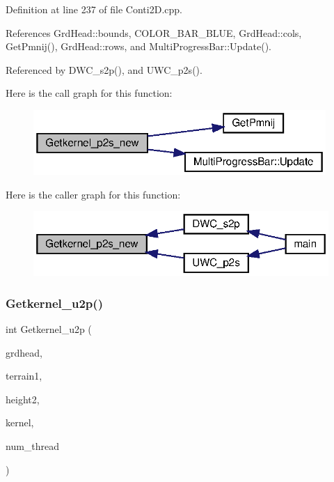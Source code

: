 Definition at line 237 of file Conti2\+D.\+cpp.



References Grd\+Head\+::bounds, C\+O\+L\+O\+R\+\_\+\+B\+A\+R\+\_\+\+B\+L\+UE, Grd\+Head\+::cols, Get\+Pmnij(), Grd\+Head\+::rows, and Multi\+Progress\+Bar\+::\+Update().



Referenced by D\+W\+C\+\_\+s2p(), and U\+W\+C\+\_\+p2s().

Here is the call graph for this function\+:\nopagebreak
\begin{figure}[H]
\begin{center}
\leavevmode
\includegraphics[width=315pt]{Conti2D_8cpp_a78d8a6b80166f8976a0f18caddbe1dcb_a78d8a6b80166f8976a0f18caddbe1dcb_cgraph}
\end{center}
\end{figure}
Here is the caller graph for this function\+:\nopagebreak
\begin{figure}[H]
\begin{center}
\leavevmode
\includegraphics[width=320pt]{Conti2D_8cpp_a78d8a6b80166f8976a0f18caddbe1dcb_a78d8a6b80166f8976a0f18caddbe1dcb_icgraph}
\end{center}
\end{figure}
\mbox{\label{Conti2D_8cpp_a9b8597bfdb8429464d4453d41cbfb2d3_a9b8597bfdb8429464d4453d41cbfb2d3}} 
\subsubsection{Getkernel\+\_\+u2p()}
{\footnotesize\ttfamily int Getkernel\+\_\+u2p (\begin{DoxyParamCaption}\item[{\textbf{ Grd\+Head}}]{grdhead,  }\item[{double $\ast$}]{terrain1,  }\item[{double}]{height2,  }\item[{double $\ast$$\ast$}]{kernel,  }\item[{int}]{num\+\_\+thread }\end{DoxyParamCaption})}



